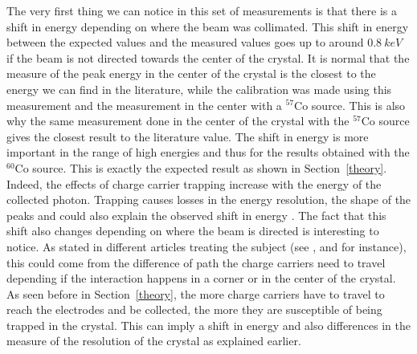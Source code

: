 \documentclass[11pt,a4paper]{article}
\begin{document}
The very first thing we can notice in this set of measurements is that there is a shift in energy depending on where the beam was collimated. This shift in energy between the expected values \cite{lit} and the measured values goes up to around $0.8~keV$ if the beam is not directed towards the center of the crystal. It is normal that the measure of the peak energy in the center of the crystal is the closest to the energy we can find in the literature, while the calibration was made using this measurement and the measurement in the center with a $^{57}$Co source. This is also why the same measurement done in the center of the crystal with the $^{57}$Co source gives the closest result to the literature value. The shift in energy is more important in the range of high energies and thus for the results obtained with the $^{60}$Co source. This is exactly the expected result as shown in Section~\ref{theory}. Indeed, the effects of charge carrier trapping increase with the energy of the collected photon. Trapping causes losses in the energy resolution, the shape of the peaks and could also explain the observed shift in energy \cite{Trammell}. The fact that this shift also changes depending on where the beam is directed is interesting to notice. As stated in different articles treating the subject (see \cite{Trammell}, \cite{Martini} and \cite{Raudorf} for instance), this could come from the difference of path the charge carriers need to travel depending if the interaction happens in a corner or in the center of the crystal. As seen before in Section~\ref{theory}, the more charge carriers have to travel to reach the electrodes and be collected, the more they are susceptible of being trapped in the crystal. This can imply a shift in energy and also differences in the measure of the resolution of the crystal as explained earlier.
\end{document}
